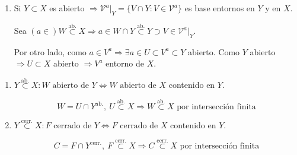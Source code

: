 \begin{ej}
\begin{enumerate}
    \item Si $Y \subset X$ es abierto $\Rightarrow \mathcal{V}^a|_Y = \{V \cap Y : V \in \mathcal{V}^a\} $ es base entornos en $Y$ y en $X$.
    \begin{demo}
        Sea $(a \in ) W \stackrel{\text{ab.}}{\subset } X \Rightarrow a \in W \cap Y \stackrel{\text{ab.}}{\subset } Y \supset V \in \mathcal{V}^a|_Y$.

        Por otro lado, como $a \in V^a \Rightarrow \exists a \in U \subset V^a \subset Y$ abierto. Como $Y$ abierto $\Rightarrow U \subset X$ abierto $\Rightarrow V^a$ entorno de $X$.
    \end{demo}
\end{enumerate}
\end{ej}

\begin{obs}
\begin{enumerate}
    \item $Y \stackrel{\text{ab.}}{\subset} X: W \text{ abierto de } Y \Leftrightarrow W \text{ abierto de } X$ contenido en $Y$.
    \begin{demo}    
    \[
    W = U \cap Y^{\text{ab.}},\ U \stackrel{\text{ab.}}{\subset} X \Rightarrow W \stackrel{\text{ab.}}{\subset} X \text{ por intersección finita}
    \]
    \end{demo}
    \item $Y \stackrel{\text{cerr.}}{\subset} X: F \text{ cerrado de } Y \Leftrightarrow F \text{ cerrado de } X$ contenido en $Y$.
    \begin{demo}
    \[
    C = F \cap Y^{\text{cerr.}},\ F \stackrel{\text{cerr.}}{\subset} X \Rightarrow C \stackrel{\text{cerr.}}{\subset} X \text{ por intersección finita}
    \]
    \end{demo}
\end{enumerate}
\end{obs}
